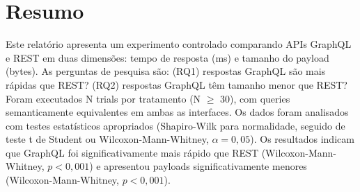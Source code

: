 \section*{Resumo}

Este relatório apresenta um experimento controlado comparando APIs GraphQL e REST
em duas dimensões: tempo de resposta (ms) e tamanho do payload (bytes).
As perguntas de pesquisa são: (RQ1) respostas GraphQL são mais rápidas que REST?
(RQ2) respostas GraphQL têm tamanho menor que REST? Foram executados N trials
por tratamento (N $\ge$ 30), com queries semanticamente equivalentes em ambas
as interfaces. Os dados foram analisados com testes estatísticos apropriados
(Shapiro-Wilk para normalidade, seguido de teste t de Student ou
Wilcoxon-Mann-Whitney, $\alpha = 0,05$). Os resultados indicam que GraphQL foi significativamente mais rápido que REST (Wilcoxon-Mann-Whitney, $p < 0,001$) e apresentou payloads significativamente menores (Wilcoxon-Mann-Whitney, $p < 0,001$).
